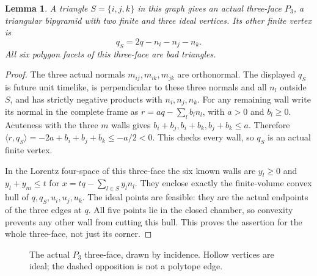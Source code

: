\documentclass[11pt]{article}
\newtheorem{lemma}[theorem]{Lemma}
\newcommand{\ip}[2]{\langle #1,#2\rangle}
\newcommand{\Pthree}{P_3}
\begin{document}
\begin{lemma}\label{lem:P3}
A triangle $S=\{i,j,k\}$ in this graph gives an actual three-face
$\Pthree$, a triangular bipyramid with two finite and three ideal
vertices. Its other finite vertex is
\begin{equation}\label{eq:move}
 q_S=2q-n_i-n_j-n_k.
\end{equation}
All six polygon facets of this three-face are bad triangles.
\end{lemma}
\begin{proof}
The three actual normals $m_{ij},m_{ik},m_{jk}$ are orthonormal.
The displayed $q_S$ is future unit timelike, is perpendicular to
these three normals and all $n_l$ outside $S$, and has strictly
negative products with $n_i,n_j,n_k$.
For any remaining wall write its normal in the complete frame as
$r=a q-\sum_l b_l n_l$, with $a>0$ and $b_l\ge0$.
Acuteness with the three $m$ walls gives
$b_i+b_j,b_i+b_k,b_j+b_k\le a$. Therefore
$\ip{r}{q_S}=-2a+b_i+b_j+b_k\le-a/2<0$.
This checks every wall, so $q_S$ is an actual finite vertex.

In the Lorentz four-space of this three-face the six known walls
are $y_l\ge0$ and $y_l+y_m\le t$ for
$x=tq-\sum_{l\in S}y_l n_l$. They enclose exactly the finite-volume
convex hull of $q,q_S,u_i,u_j,u_k$. The ideal points are feasible:
they are the actual endpoints of the three edges at $q$.
All five points lie in the closed chamber, so convexity prevents any
other wall from cutting this hull. This proves the assertion for
the whole three-face, not just its corner.
\end{proof}

\begin{figure}[ht]
\centering
{}
\caption{The actual $\Pthree$ three-face, drawn by incidence. Hollow
vertices are ideal; the dashed opposition is not a polytope edge.}
\label{fig:P3}
\end{figure}
\end{document}
